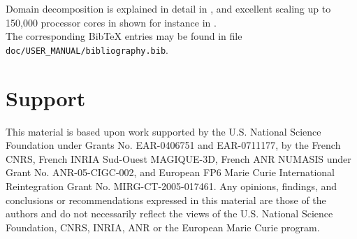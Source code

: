 Domain decomposition is explained in detail in \cite{MaKoBlLe08}, and excellent scaling up to 150,000 processor cores in shown for instance in
\cite{CaKoLaTiMiLeSnTr08,KoLaMi08a,MaKoBlLe08,KoErGoMi10,Kom11}.\\

The corresponding Bib\TeX{} entries may be found
in file \texttt{doc/USER\_MANUAL/bibliography.bib}.

\section{Support}

This material is based upon work supported by the U.S. National Science
Foundation under Grants No. EAR-0406751 and EAR-0711177, by the French
CNRS, French INRIA Sud-Ouest MAGIQUE-3D, French ANR NUMASIS under
Grant No. ANR-05-CIGC-002, and European FP6 Marie Curie International
Reintegration Grant No. MIRG-CT-2005-017461.
Any opinions, findings, and conclusions or recommendations expressed in this material are
those of the authors and do not necessarily reflect the views of the
U.S. National Science Foundation, CNRS, INRIA, ANR or the European
Marie Curie program.



